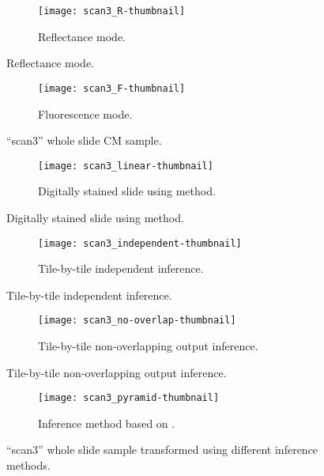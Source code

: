 \documentclass[../main.tex]{subfiles}
\begin{document}
\begin{figure}[H]
\centering
\begin{subfigure}{\textwidth}
\centering
\texttt{[image: scan3\_R-thumbnail]}
\caption{Reflectance mode.}
\label{fig:inference-comparison-scan3-R}
\end{subfigure}
\end{figure}%
\begin{figure}[H]\ContinuedFloat
\centering
\begin{subfigure}{\textwidth}
\centering
\texttt{[image: scan3\_F-thumbnail]}
\caption{Fluorescence mode.}
\label{fig:inference-comparison-scan3-F}
\end{subfigure}
\caption{``scan3'' whole slide CM sample.}
\end{figure}

\begin{figure}[H]
\centering
\begin{subfigure}{\textwidth}
\centering
\texttt{[image: scan3\_linear-thumbnail]}
\caption{Digitally stained slide using \cite{Gareau2009} method.}
\label{fig:inference-comparison-scan3-linear}
\end{subfigure}
\end{figure}%
\begin{figure}[H]\ContinuedFloat
\centering
\begin{subfigure}{\textwidth}
\centering
\texttt{[image: scan3\_independent-thumbnail]}
\caption{Tile-by-tile independent inference.}
\label{fig:inference-comparison-scan3-independent}
\end{subfigure}
\end{figure}%
\begin{figure}[H]\ContinuedFloat
\centering
\begin{subfigure}{\textwidth}
\centering
\texttt{[image: scan3\_no-overlap-thumbnail]}
\caption{Tile-by-tile non-overlapping output inference.}
\label{fig:inference-comparison-scan3-no-overlap}
\end{subfigure}
\end{figure}%
\begin{figure}[H]\ContinuedFloat
\centering
\begin{subfigure}{\textwidth}
\centering
\texttt{[image: scan3\_pyramid-thumbnail]}
\caption{Inference method based on \cite{Bel2019}.}
\label{fig:inference-comparison-scan3-pyramid}
\end{subfigure}
\caption{``scan3'' whole slide sample transformed using different inference
methods.}
\label{fig:inference-comparison-scan3}
\end{figure}
\end{document}
